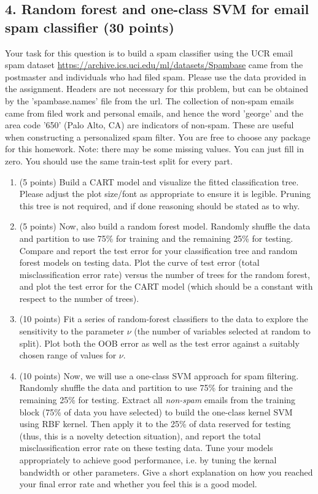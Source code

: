 \documentclass[twoside,10pt]{article}
\begin{document}
\subsection*{4. Random forest and one-class SVM for email spam classifier (30 points)} 

Your task for this question is to build a spam classifier using the UCR email spam dataset \url{https://archive.ics.uci.edu/ml/datasets/Spambase} came from the postmaster and individuals who had filed spam. Please use the data provided in the assignment. Headers are not necessary for this problem, but can be obtained by the 'spambase.names' file from the url. The collection of non-spam emails came from filed work and personal emails, and hence the word \textsf{'george'} and the area code \textsf{'650'} (Palo Alto, CA) are indicators of non-spam. These are useful when constructing a personalized spam filter. You are free to choose any package for this homework. Note: there may be some missing values. You can just fill in zero. You should use the same train-test split for every part.

\begin{enumerate}

\item (5 points) Build a CART model and visualize the fitted classification tree. Please adjust the plot size/font as appropriate to ensure it is legible. Pruning this tree is not required, and if done reasoning should be stated as to why.

\item (5 points) Now, also build a random forest model. Randomly shuffle the data and partition to use  75\% for training and the remaining 25\% for testing. Compare and report the test error for your classification tree and random forest models on testing data. Plot the curve of test error (total misclassification error rate) versus the number of trees for the random forest, and plot the test error for the CART model (which should be a constant with respect to the number of trees). 


\item (10 points) Fit a series of random-forest classifiers to the data to explore the sensitivity to the parameter $\nu$ (the number of variables selected at random to split). Plot both the OOB error as well as the test error against a suitably chosen range of values for $\nu$.

\item (10 points) Now, we will use a one-class SVM approach for spam filtering. Randomly shuffle the data and partition to use  75\% for training and the remaining 25\% for testing. Extract all {\it non-spam} emails from the training block (75\% of data you have selected) to build the one-class kernel SVM using RBF kernel. Then apply it to the 25\% of data reserved for testing (thus, this is a novelty detection situation), and report the total misclassification error rate on these testing data. Tune your models appropriately to achieve good performance, i.e. by tuning the kernal bandwidth or other parameters. Give a short explanation on how you reached your final error rate and whether you feel this is a good model.

\end{enumerate}
\end{document}
